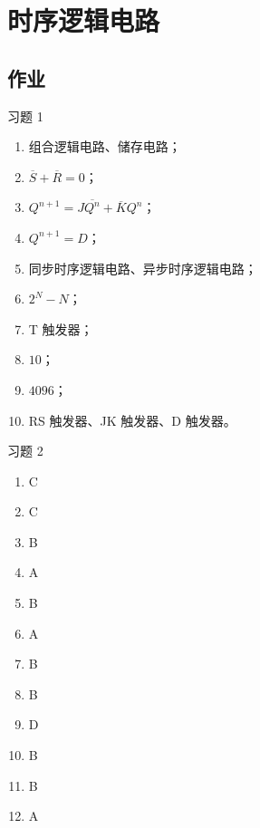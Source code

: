 \section{时序逻辑电路}

\subsection{作业}

\begin{problem}
    习题 1
    \begin{solution}
        \begin{enumerate}
            \item 组合逻辑电路、储存电路；
            \item $\overline{S} + \overline{R} = 0$；
            \item $Q^{n+1} = J \overline{Q^{n}} + \overline{K} Q^{n}$；
            \item $Q^{n+1} = D$；
            \item 同步时序逻辑电路、异步时序逻辑电路；
            \item $2^{N} - N$；
            \item T 触发器；
            \item $10$；
            \item $4096$；
            \item RS 触发器、JK 触发器、D 触发器。
        \end{enumerate}
    \end{solution}
\end{problem}

\begin{problem}
    习题 2
    \begin{solution}
        \begin{enumerate}
            \item C
            \item C
            \item B
            \item A
            \item B
            \item A
            \item B
            \item B
            \item D
            \item B
            \item B
            \item A
        \end{enumerate}
    \end{solution}
\end{problem}

